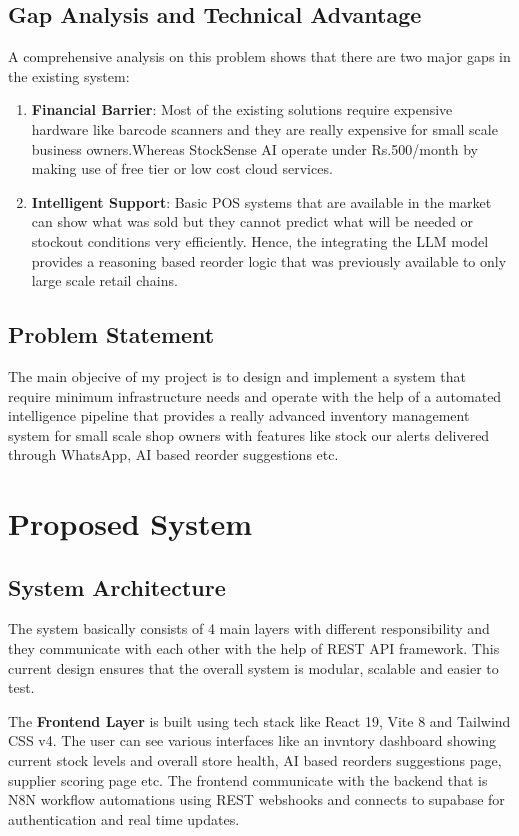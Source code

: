 \documentclass[journal]{IEEEtran}
\begin{document}
\subsection{Gap Analysis and Technical Advantage}
A comprehensive analysis on this problem shows that there are two major gaps in the existing system:
\begin{enumerate}
    \item \textbf{Financial Barrier}: Most of the existing solutions require expensive hardware like barcode scanners and they are really expensive for small scale business owners.Whereas StockSense AI operate under Rs.500/month by making use of free tier or low cost cloud services.
    \item \textbf{Intelligent Support}: Basic POS systems that are available in the market can show what was sold but they cannot predict what will be needed or stockout conditions very efficiently. Hence, the integrating the LLM model provides a reasoning based reorder logic that was previously available to only large scale retail chains. 
\end{enumerate}

\subsection{Problem Statement}
The main objecive of my project is to design and implement a system that require minimum infrastructure needs and operate with the help of a automated intelligence pipeline that provides a really advanced inventory management system for small scale shop owners with features like stock our alerts delivered through WhatsApp, AI based reorder suggestions etc. 

\section{Proposed System}

\subsection{System Architecture}

The system basically consists of 4 main layers with  different responsibility and they communicate with each other with the help of REST API framework. This current design ensures that the overall system is modular, scalable and easier to test.

The \textbf{Frontend Layer} is built using tech stack like React 19, Vite 8 and Tailwind CSS v4. The user can see various interfaces like an invntory dashboard showing current stock levels and overall store health, AI based reorders suggestions page, supplier scoring page etc. The frontend communicate with the backend that is N8N workflow automations using REST webshooks and connects to supabase for authentication and real time updates.
\end{document}
